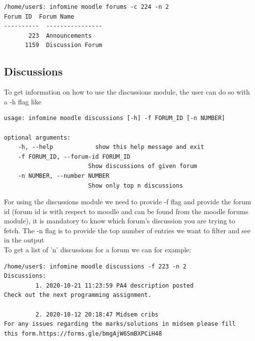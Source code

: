 \documentclass[12pt, letterpaper, twoside]{article}
\begin{document}
\begin{verbatim}
/home/user$: infomine moodle forums -c 224 -n 2
Forum ID  Forum Name
----------  ----------------
       223  Announcements
      1159  Discussion Forum
\end{verbatim}

\subsection{Discussions}
To get information on how to use the discussions module, the user can do so with a -h flag like 
\begin{verbatim}
usage: infomine moodle discussions [-h] -f FORUM_ID [-n NUMBER]

optional arguments:
    -h, --help            show this help message and exit
    -f FORUM_ID, --forum-id FORUM_ID
                        Show discussions of given forum
    -n NUMBER, --number NUMBER
                        Show only top n discussions    
\end{verbatim}
For using the discussions module we need to provide -f flag and provide the forum id (forum id is with respect to moodle and can be found from the moodle forums module), it is mandatory to know which forum's discussion you are trying to fetch. The -n flag is to provide the top number of entries we want to filter and see in the output\\
To get a list of 'n' discussions for a forum we can for example:

\begin{verbatim}
/home/user$: infomine moodle discussions -f 223 -n 2
Discussions:
         1. 2020-10-21 11:23:59 PA4 description posted
Check out the next programming assignment. 

         2. 2020-10-12 20:18:47 Midsem cribs
For any issues regarding the marks/solutions in midsem please fill this form.https://forms.gle/bmgAjW6SmBXPCiH48
\end{verbatim}
\end{document}
